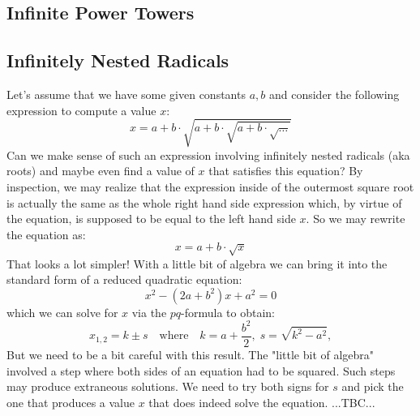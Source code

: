 \subsection{Infinite Power Towers}





\subsection{Infinitely Nested Radicals}
Let's assume that we have some given constants $a,b$ and consider the following expression to compute a value $x$:
\begin{equation}
 x = a + b \cdot \sqrt{a + b \cdot \sqrt{a + b \cdot \sqrt{\ldots}}}
\end{equation}
Can we make sense of such an expression involving infinitely nested radicals (aka roots) and maybe even find a value of $x$ that satisfies this equation? By inspection, we may realize that the expression inside of the outermost square root is actually the same as the whole right hand side expression which, by virtue of the equation, is supposed to be equal to the left hand side $x$. So we may rewrite the equation as:
\begin{equation}
 x = a + b \cdot \sqrt{x}
\end{equation}
That looks a lot simpler! With a little bit of algebra we can bring it into the standard form of a reduced quadratic equation:
\begin{equation}
x^2 - (2a + b^2) x + a^2 = 0
\end{equation}
which we can solve for $x$ via the $pq$-formula to obtain:
\begin{equation}
x_{1,2} = k \pm s 
\quad \text{where} \quad
k = a + \frac{b^2}{2}, \;
s = \sqrt{k^2 - a^2}, 
\end{equation}
But we need to be a bit careful with this result. The "little bit of algebra" involved a step where both sides of an equation had to be squared. Such steps may produce extraneous solutions. We need to try both signs for $s$ and pick the one that produces a value $x$ that does indeed solve the equation. ...TBC...


